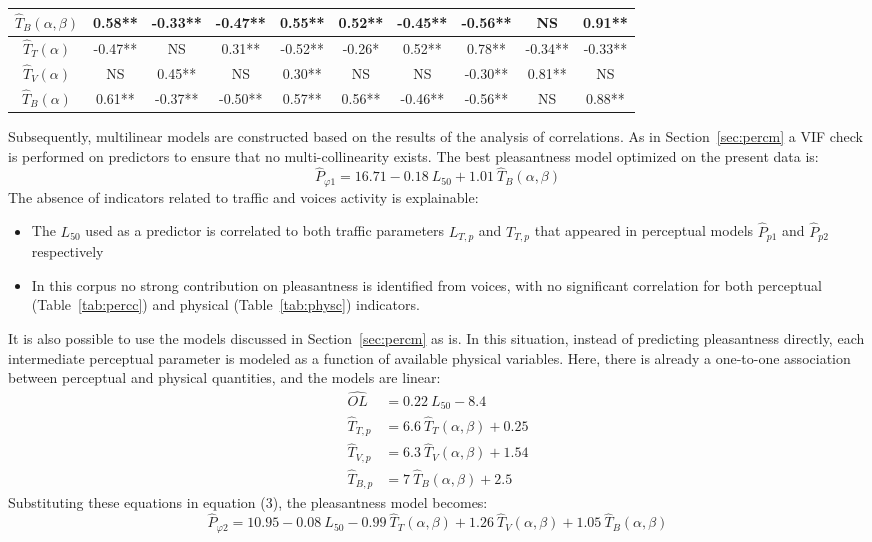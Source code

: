 \documentclass[11pt,a4paper]{article}
\begin{document}
\begin{table}
{\begin{tabular}{ c | c c c c c | c c c c }
	$\hat T_B(\alpha, \beta)$ & 0.58** & -0.33** & -0.47** & 0.55** & 0.52** & -0.45** & -0.56** & NS & 0.91** \\ \hline
	$\hat T_T(\alpha)$ & -0.47** & NS & 0.31** & -0.52** & -0.26* & 0.52** & 0.78** & -0.34** & -0.33** \\
	$\hat T_V(\alpha)$ & NS & 0.45** & NS & 0.30** & NS & NS & -0.30** & 0.81** & NS \\
	$\hat T_B(\alpha)$ & 0.61** & -0.37** & -0.50** & 0.57** & 0.56** & -0.46** & -0.56** & NS & 0.88** \\ \hline
\end{tabular}
}
\end{table}


Subsequently, multilinear models are constructed based on the results of the analysis of correlations. As in Section~\ref{sec:percm} a VIF check is performed on predictors to ensure that no multi-collinearity exists. The best pleasantness model optimized on the present data is:
\begin{equation}
\hat P_{\varphi 1} = 16.71 - 0.18~L_{50} + 1.01~\hat T_B(\alpha, \beta)
\end{equation}
The absence of indicators related to traffic and voices activity is explainable:
\begin{itemize}
\item The $L_{50}$ used as a predictor is correlated to both traffic parameters $L_{T, p}$ and $T_{T, p}$ that appeared in perceptual models $\hat P_{p1}$ and $\hat P_{p2}$ respectively
\item In this corpus no strong contribution on pleasantness is identified from voices, with no significant correlation for both perceptual (Table~\ref{tab:percc}) and physical (Table~\ref{tab:physc}) indicators.
\end{itemize}
It is also possible to use the models discussed in Section~\ref{sec:percm} as is. In this situation, instead of predicting pleasantness directly, each intermediate perceptual parameter is modeled as a function of available physical variables. Here, there is already a one-to-one association between perceptual and physical quantities, and the models are linear:
\begin{align}
\hat{OL} &= 0.22~L_{50} - 8.4\\
\hat{T}_{T, p} &= 6.6~\hat T_{T}(\alpha, \beta) + 0.25\\
\hat{T}_{V, p} &= 6.3~\hat T_{V}(\alpha, \beta) + 1.54\\
\hat{T}_{B, p} &= 7~\hat T_{B}(\alpha, \beta) + 2.5
\end{align}
Substituting these equations in equation (3), the pleasantness model becomes:
\begin{equation}
\hat P_{\varphi 2} = 10.95 - 0.08~L_{50} - 0.99~\hat T_{T}(\alpha, \beta) + 1.26~\hat T_{V}(\alpha, \beta) + 1.05~\hat T_{B}(\alpha, \beta)
\end{equation}
\end{document}
